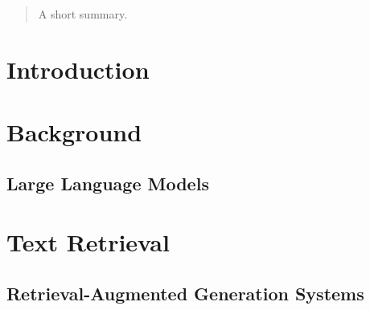 \documentclass[english,master]{swsLeipzig}
\begin{document}
\begin{frontmatter}
  \begin{abstract}
    A short summary.
  \end{abstract}

  \tableofcontents





\end{frontmatter}

\chapter{Introduction}\label{introduction}


\chapter{Background}\label{background}

\section{Large Language Models}\label{llm}


\chapter{Text Retrieval}\label{retrieval}


\section{Retrieval-Augmented Generation Systems}\label{rag}



\end{document}
